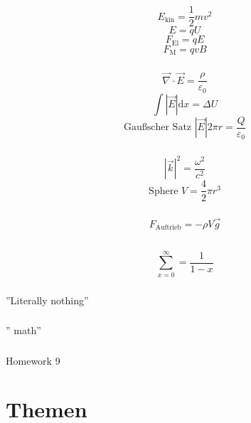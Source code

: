 \documentclass[12pt]{report}
\newcommand{\vabla}{\vec{\nabla}}
\newcommand{\vepsilon}{\varepsilon}
\newcommand{\dd}{\mathrm{d}}
\begin{document}
\section{}

\subsection{}
\[E_\mathrm{kin}=\frac{1}{2}mv^2\]
\[E=qU\]
\[F_\mathrm{El}=qE\]
\[F_\mathrm{M}=qvB\]

\subsection{}
\[\vabla\cdot\vec{E}=\frac{\rho}{\vepsilon_0}\]
\[\int|\vec{E}|\dd x=\Delta U\]
\[\textrm{Gau\ss scher Satz }|\vec{E}|2\pi r=\frac{Q}{\vepsilon_0}\]

\subsection{}
\[|\vec{k}|^2=\frac{\omega^2}{c^2}\]
\[\textrm{Sphere }V=\frac{4}{2}\pi r^3\]

\subsection{} 
\[F_\mathrm{Auftrieb}=-\rho V\vec{g}\]

\section{}

\subsection{}
\[\sum_{x=0}^\infty=\frac{1}{1-x}\]

\subsection{}
''Literally nothing''

\subsection{}
'' math''

\subsection{}
Homework 9

\chapter{Themen}
\end{document}
